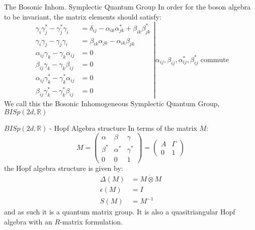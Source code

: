 \documentclass[pdf,colorBG,slideColor,fyma]{prosper}
\newcommand{\beq}{\[}
\newcommand{\eeq}{\]}
\def\IR{\mathbb{R}}
\def\BISp{$BISp(2d, \IR)\;$}
\begin{document}

\begin{slide}{The Bosonic Inhom. Symplectic Quantum Group}
In order for the boson algebra to be invariant, the matrix elements
should satisfy:
\[
\left.
\begin{aligned}
\gamma_i \gamma^*_j - \gamma^*_j \gamma_i &= \delta_{ij} - \alpha_{ik}\alpha^*_{jk} + \beta_{ik} \beta^*_{jk} \\
\gamma_i \gamma_j - \gamma_j \gamma_i &= \beta_{ik} \alpha_{jk} - \alpha_{ik} \beta_{jk} \\
\alpha_{ij} \gamma_k - \gamma_k \alpha_{ij} & = 0 \\
\beta_{ij} \gamma_k - \gamma_k \beta_{ij} & = 0 \\
\alpha_{ij} \gamma^*_k - \gamma^*_k \alpha_{ij} & = 0 \\
\beta_{ij} \gamma^*_k - \gamma^*_k \beta_{ij} & = 0
\end{aligned}
\right|
\text{$\alpha_{ij}, \beta_{ij}, \alpha^*_{ij}, \beta^*_{ij}$ commute}
\]
\break
\break
We call this the Bosonic Inhomogeneous Symplectic Quantum Group, \BISp
\end{slide}


\begin{slide}{\BISp - Hopf Algebra structure}
In terms of the matrix $M$:
\beq M = \left(
\begin{array}{cc|c}
\alpha & \beta & \gamma \\
\beta^* & \alpha^* & \gamma^* \\
\hline 0 & 0 & 1
\end{array}
\right)
 =
\left(
\begin{array}{c|c}
A & \Gamma \\
\hline 0 & 1
\end{array}
\right)
\eeq
the Hopf algebra structure is given by:
\begin{align*}
\Delta(M) & = M \dot{\otimes} M \\
\epsilon(M) & = I  \\
S(M) & = M^{-1}
\end{align*}
and as such it is a quantum matrix group. It is also
a quasitriangular Hopf algebra with an $R$-matrix formulation.
\end{slide}

\end{document}
